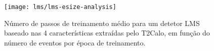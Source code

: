 \begin{figure}
\begin{center}
\texttt{[image: lms/lms-esize-analysis]}
\end{center}
\caption{Número de passos de treinamento médio para um detetor LMS baseado nas
4 características extraídas pelo T2Calo, em função do número de eventos por
época de treinamento.}
\label{fig:lms-esize-analysis}
\end{figure}

